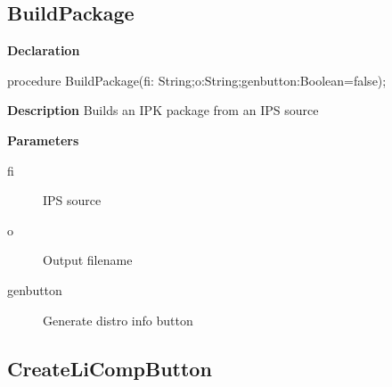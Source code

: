 \documentclass{report}
\newif\ifpdf
\begin{document}
\subsection*{BuildPackage}
\fi
\label{ipkbuild-BuildPackage}
\begin{list}{}{
\setlength{\itemindent}{0cm}
\setlength{\listparindent}{0cm}
\setlength{\leftmargin}{\evensidemargin}
\addtolength{\leftmargin}{\tmplength}
\settowidth{\labelsep}{X}
\addtolength{\leftmargin}{\labelsep}
\setlength{\labelwidth}{\tmplength}
}
\item[\textbf{Declaration}\hfill]
\ifpdf
\begin{flushleft}
\fi
\begin{ttfamily}
procedure BuildPackage(fi: String;o:String;genbutton:Boolean=false);\end{ttfamily}

\ifpdf
\end{flushleft}
\fi

\par
\item[\textbf{Description}]
Builds an IPK package from an IPS source   \par
\item[\textbf{Parameters}]
\begin{description}
\item[fi] IPS source
\item[o] Output filename
\item[genbutton] Generate distro info button
\end{description}


\end{list}
\ifpdf
\subsection*{\large{\textbf{CreateLiCompButton}}\normalsize\hspace{1ex}\hrulefill}
\else
\end{document}

